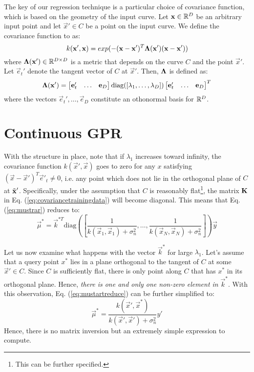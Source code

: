 \documentclass[]{article}
\begin{document}
The key of our regression technique is a particular choice of covariance function, which is based on the geometry of the input curve. Let $\boldsymbol{\mathbf{x}} \in \mathbb{R}^D$ be an arbitrary input point and let $\vec x' \in C$  be a point on the input curve. We define the covariance function to as:
\begin{equation}
  \label{eq:covardef}
  k(\boldsymbol{\mathbf{x}}', \boldsymbol{\mathbf{x}}) = exp(-(\boldsymbol{\mathbf{x}} - \boldsymbol{\mathbf{x}}')^T\boldsymbol{\mathbf{{\Lambda}}}(\boldsymbol{\mathbf{x}}') (\boldsymbol{\mathbf{x}} - \boldsymbol{\mathbf{x}}'))
\end{equation}
where $\boldsymbol{\mathbf{{\Lambda}}}(\boldsymbol{\mathbf{x}}') \in \mathbb{R}^{D \times D}$ is a metric that depends on the curve $C$ and the point $\vec x'$. Let $\vec e_t'$ denote the tangent vector of $C$ at $\vec x'$. Then, $\boldsymbol{\mathbf{{\Lambda}}}$ is defined as:
\begin{equation}
  \label{eq:lambdadefinition}
  \boldsymbol{\mathbf{{\Lambda}}}(\boldsymbol{\mathbf{x}}') =
  \begin{bmatrix}
    \boldsymbol{\mathbf{e}}_t' & \hdots & \boldsymbol{\mathbf{e}}_D
  \end{bmatrix}
  \text{diag}([\lambda_1,\hdots, \lambda_D])
  \begin{bmatrix}
    \boldsymbol{\mathbf{e}}_t' & \hdots & \boldsymbol{\mathbf{e}}_D
  \end{bmatrix}^T
\end{equation}
where the vectors $\vec e_t', \hdots, \vec e_D$ constitute an othonormal basis for $\mathbb{R}^D$. 

\section{Continuous GPR}
With the structure in place, note that if $\lambda_1$ increases toward infinity, the covariance function $k(\vec x', \vec x)$ goes to zero for any $x$ satisfying $(\vec x - \vec x')^T\vec e'_t \neq 0$, i.e. any point which does not lie in the orthogonal plane of $C$ at $\tilde{\boldsymbol{\mathbf{x}}}'$. Specifically, under the assumption that $C$ is reasonably flat\footnote{This can be further specified.}, the matrix $\boldsymbol{\mathbf{{K}}}$ in Eq. (\ref{eq:covariancetrainingdata}) will become diagonal. This means that Eq. (\ref{eq:mustrar}) reduces to:
\begin{equation}
  \label{eq:mustartreduce}
    \vec \mu^* = \vec k^{*T} \text{diag}\left(\left[\frac{1}{k(\vec x_1,\vec x_1)+\sigma_n^2},\hdots,\frac{1}{k(\vec x_N,\vec x_N)+\sigma_n^2}\right]\right)\vec y
\end{equation}

Let us now examine what happens with the vector $\vec k^*$ for large $\lambda_1$. Let's assume that a query point $x^*$ lies in a plane orthogonal to the tangent of $C$ at some $\vec x' \in C$. Since $C$ is sufficiently flat, there is only point along $C$ that has $x^*$ in its orthogonal plane. Hence, \emph{there is one and only one non-zero element in } $\vec k^*$. With this observation, Eq. (\ref{eq:mustartreduce}) can be further simplified to:
\begin{equation}
  \label{eq:mustartreduce}
    \vec \mu^* = \frac{k(\vec x',\vec x^*)}{k(\vec x',\vec x') + \sigma_n^2} y'
\end{equation}
Hence, there is no matrix inversion but an extremely simple expression to compute. 
\end{document}
